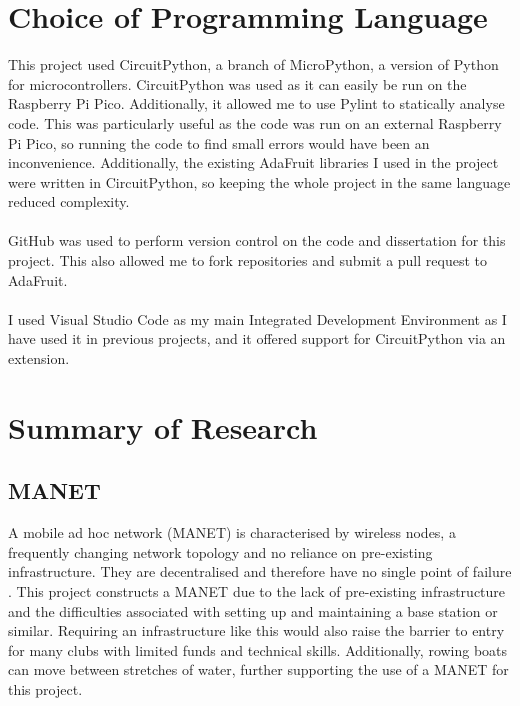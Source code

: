 \documentclass[12pt,a4paper]{report}
\begin{document}
\section{Choice of Programming Language}  
This project used CircuitPython, a branch of MicroPython, a version of Python for microcontrollers. CircuitPython was used as it can easily be run on the Raspberry Pi Pico. Additionally, it allowed me to use Pylint to statically analyse code. This was particularly useful as the code was run on an external Raspberry Pi Pico, so running the code to find small errors would have been an inconvenience. Additionally, the existing AdaFruit libraries I used in the project were written in CircuitPython, so keeping the whole project in the same language reduced complexity. \\ \\
GitHub was used to perform version control on the code and dissertation for this project. This also allowed me to fork repositories and submit a pull request to AdaFruit. \\ \\ 
I used Visual Studio Code as my main Integrated Development Environment as I have used it in previous projects, and it offered support for CircuitPython via an extension.




\section{Summary of Research}
\subsection{MANET}
A mobile ad hoc network (MANET) is characterised by wireless nodes, a frequently changing network topology and no reliance on pre-existing infrastructure. They are decentralised and therefore have no single point of failure \cite{d2}.  This project constructs a MANET due to the lack of pre-existing infrastructure and the difficulties associated with setting up and maintaining a base station or similar. Requiring an infrastructure like this would also raise the barrier to entry for many clubs with limited funds and technical skills. Additionally, rowing boats can move between stretches of water, further supporting the use of a MANET for this project.
\end{document}
